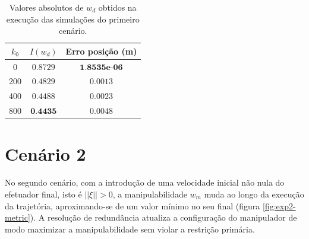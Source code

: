 \begin{table}[htbp]
    \centering
    \begin{tabular}{ccc}
        \toprule
        \( k_0 \) & \( I(w_d) \)  & Erro posição (m) \\
        \midrule
        0  & \( 0.8729 \) & \( \textbf{1.8535e-06} \) \\
        200  & \( 0.4829 \) & \( 0.0013 \) \\
        400  & \( 0.4488 \) & \( 0.0023 \) \\
        800  & \( \textbf{0.4435} \) & \( 0.0048 \) \\
        \bottomrule
    \end{tabular}
    \caption{Valores absolutos de \(w_d\) obtidos na execução das simulações do primeiro cenário.}
    \label{tab:scores-exp1}
\end{table}

\section{Cenário 2}
	
No segundo cenário, com a introdução de uma velocidade inicial não nula do efetuador final, isto é \(||\xi|| > 0 \), 
a manipulabilidade \(w_m\) muda ao longo da execução da trajetória, aproximando-se de um valor mínimo no seu final (figura \ref*{fig:exp2-metric}). 
A resolução de redundância atualiza a configuração do manipulador de modo maximizar a manipulabilidade sem violar a restrição primária.


